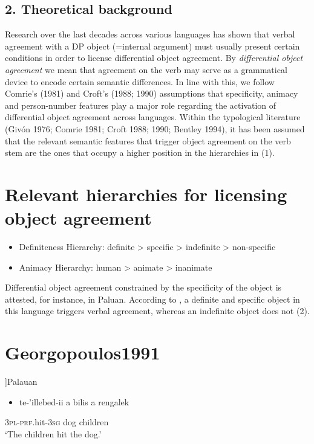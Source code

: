 \documentclass[output=paper]{langsci/langscibook}
\begin{document}
\section{ 2. Theoretical background}

Research over the last decades across various languages has shown that verbal agreement with a DP object (=internal argument) must usually present certain conditions in order to license differential object agreement. By \textit{differential object agreement} we mean that agreement on the verb may serve as a grammatical device to encode certain semantic differences. In line with this, we follow Comrie’s (1981) and Croft’s (1988; 1990) assumptions that specificity, animacy and person-number features play a major role regarding the activation of differential object agreement across languages. Within the typological literature (Givón 1976; Comrie 1981; Croft 1988; 1990; Bentley 1994), it has been assumed that the relevant semantic features that trigger object agreement on the verb stem are the ones that occupy a higher position in the hierarchies in (1).

\chapter[Relevant hierarchies for licensing object agreement]{Relevant hierarchies for licensing object agreement}
\label{bkm:Ref455880189}\setcounter{itemize}{0}
\begin{itemize}
\item \gll \textup{Definiteness Hierarchy: definite {\textgreater} specific {\textgreater} indefinite {\textgreater} non-specific}\\
\item \gll \textup{Animacy Hierarchy: human {\textgreater} animate {\textgreater} inanimate}\\
\end{itemize}

Differential object agreement constrained by the specificity of the object is attested, for instance, in Paluan. According to \citet[218]{Woolford2000}, a definite and specific object in this language triggers verbal agreement, whereas an indefinite object does not (2).

\chapter[Palauan \citep[30]{Georgopoulos1991}]{Palauan }
\label{bkm:Ref455880309}\setcounter{itemize}{0}
\begin{itemize}
\item \gll te-’illebed-ii             a bilis          a rengalek\\
\end{itemize}
     \textsc{3pl-prf}.hit-\textsc{3sg}        dog              children\\
\glt ‘The children hit the dog.’
\z
\end{document}
